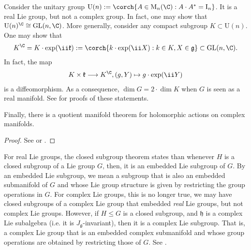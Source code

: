 \begin{example}
    Consider the unitary group \(\mathrm{U}(n):=\corch{A \in \mathrm{M}_n(\C): A\cdot A^*=\mathrm{I}_n}\). It is a real Lie group, but not a complex group. In fact, one may show that \(\mathrm{U}(n)^\C \cong \mathrm{GL}(n, \C)\). More generally, consider any compact subgroup \(K \subset \mathrm{U}(n)\). One may show that 
    \[
        K^\C=K \cdot \exp(\ii \mathfrak{k}):=\corch{k \cdot \exp(\ii X): k \in K, X \in \mathfrak{g}} \subset \mathrm{GL}(n, \C).
    \]
    In fact, the map 
    \[
        K \times \mathfrak{k} \longrightarrow K^\C, (g, Y) \mapsto g\cdot \exp(\ii Y )
    \]
    is a diffeomorphism. As a consequence, \(\dim G=2\cdot \dim K\) when \(G\) is seen as a real manifold. See \parencite[Prop. 15.2.1]{hilgert2011structure} for proofs of these statements.
\end{example}

Finally, there is a quotient manifold theorem for holomorphic actions on complex manifolds.

\begin{proof}
    See \parencite[Prop. 2.1.13]{huybrechts2005complex} or \parencite[Lemma 3.2.6]{Heinzner_Huckleberry_Mathematical}.
\end{proof}

\begin{obs}
    For real Lie groups, the closed subgroup theorem \parencite[Th. 9.3.7]{hilgert2011structure} states than whenever \(H\) is a closed subgroup of a Lie group \(G\), then, it is an embedded Lie subgroup of \(G\). By an embedded Lie subgroup, we mean a subgroup that is also an embedded submanifold of \(G\) and whose Lie group structure is given by restricting the group operations in \(G\). For complex Lie groups, this is no longer true, we may have closed subgroups of a complex Lie group that embedded \textit{real} Lie groups, but not complex Lie groups. However, if \(H \leq G\) is a closed subgroup, and \(\mathfrak{h}\) is a complex Lie subalgebra (i.e. it is \(J_{\mathfrak{g}}\)-invariant), then it is a complex Lie subgroup. That is, a complex Lie group that is an embedded complex submanifold and whose group operations are obtained by restricting those of \(G\). See \parencite[Example 2.1]{KobayashiNomizu1969Vol2}.
\end{obs}


